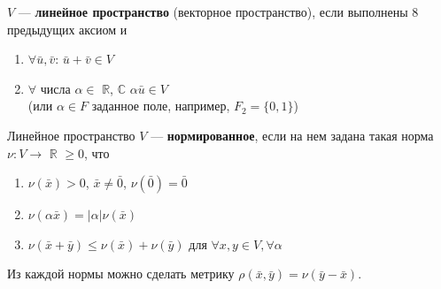 \documentclass[12pt]{article}
\theoremstyle{definition}
\numberwithin{equation}{section}
\begin{document}
	$V$ --- \textbf{линейное пространство} (векторное пространство), если выполнены 8 предыдущих аксиом и \begin{enumerate}
		\item $\forall \bar u, \bar v$: $\bar u + \bar v \in V$
		\item $\forall$ числа $\alpha \in$ $\mathbb{R}$, $\mathbb{C}$ $\alpha \bar u \in V$\\ 
		(или $\alpha \in F$ заданное поле, например, $F_2 = \{ 0, 1 \}$)\end{enumerate}
	Линейное пространство $V$ --- \textbf{нормированное}, если на нем задана такая норма \\$\nu : V \to$ $\mathbb{R}$ $\geqslant 0$, что\begin{enumerate}
		\item $\nu(\bar x) > 0$, $\bar x \neq \bar 0$, $\nu(\bar 0) = \bar 0$
		\item $\nu(\alpha \bar x) = |\alpha|\nu(\bar x)$
		\item $\nu(\bar x + \bar y) \leq \nu(\bar x) + \nu(\bar y)$ для $\forall x, y \in V, \forall \alpha$
	\end{enumerate}
	Из каждой нормы можно сделать метрику $\rho(\bar x, \bar y) = \nu(\bar y - \bar x)$.\\ \\
\end{document}
